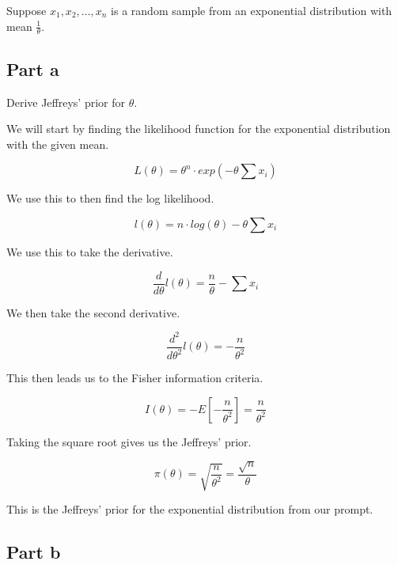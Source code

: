 \documentclass[12pt, letterpaper]{article}
\begin{document}
Suppose $x_1, x_2, \dots, x_n$ is a random sample from an exponential distribution with mean $\frac{1}{\theta}$. 
\subsection{Part a} 

Derive Jeffreys' prior for $\theta$. 

We will start by finding the likelihood function for the exponential distribution with the given mean. 

\begin{equation}
  L(\theta) = \theta^n \cdot exp(-\theta \sum x_i) 
\end{equation} 

We use this to then find the log likelihood. 

\begin{equation}
  l(\theta) = n \cdot log(\theta) - \theta \sum x_i 
\end{equation} 

We use this to take the derivative. 

\begin{equation}
  \frac{d}{d\theta}l(\theta) = \frac{n}{\theta} - \sum x_i 
\end{equation} 

We then take the second derivative. 

\begin{equation}
  \frac{d^2}{d\theta^2}l(\theta) = -\frac{n}{\theta^2} 
\end{equation} 

This then leads us to the Fisher information criteria. 

\begin{equation}
  I(\theta) = -E\left[-\frac{n}{\theta^2}\right] = \frac{n}{\theta^2} 
\end{equation} 

Taking the square root gives us the Jeffreys' prior. 

\begin{equation}
  \pi(\theta) = \sqrt{\frac{n}{\theta^2}} = \frac{\sqrt{n}}{\theta} 
\end{equation} 

This is the Jeffreys' prior for the exponential distribution from our prompt. 

\subsection{Part b} 
\end{document}
